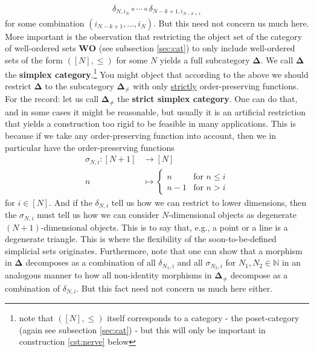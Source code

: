 \begin{align*}
  \delta_{N,i_{N}}
  \circ
  \cdots
  \circ
  \delta_{N-k+1,i_{N-k+1}}
\end{align*}
for some combination $(i_{N-k+1},\ldots,i_{N})$.
But this need not concern us much here.
More important is the observation that restricting the object set of the category of well-ordered sets $\mathbf{WO}$ (see subsection \ref{sec:cat}) to only include well-ordered sets of the form $([N],\leq)$ for some $N$ yields a full subcategory $\mathbf{\Delta}$.
We call $\mathbf{\Delta}$ the \textbf{simplex category}.\footnote{note that $([N],\leq)$ itself corresponds to a category - the poset-category (again see subsection \ref{sec:cat}) - but this will only be important in construction \ref{cst:nerve} below} You might object that according to the above we should restrict $\mathbf{\Delta}$ to the subcategory $\mathbf{\Delta}_{\neq}$ with only \underline{strictly} order-preserving functions.
For the record: let us call $\mathbf{\Delta}_{\neq}$ the \textbf{strict simplex category}.
One can do that, and in some cases it might be reasonable, but usually it is an artificial restriction that yields a construction too rigid to be feasible in many applications.
This is because if we take any order-preserving function into account, then we in particular have the order-preserving functions
\begin{align*}
  \sigma_{N,i}
  \colon
  [N + 1]
  &\rightarrow
  [N]
  \\
  n
  &\mapsto
  \begin{cases}
    n
    &
    \text{for }
    n
    \leq
    i
    \\
    n
    -
    1
    &
    \text{for }
    n
    >
    i
  \end{cases}
\end{align*}
for $i \in [N]$.
And if the $\delta_{N,i}$ tell us how we can restrict to lower dimensions, then the $\sigma_{N,i}$ must tell us how we can consider $N$-dimensional objects as {\glqq}degenerate{\grqq} $(N+1)$-dimensional objects.
This is to say that, e.g., a point or a line is a degenerate triangle.
This is where the flexibility of the soon-to-be-defined simplicial sets originates.
Furthermore, note that one can show that a morphism in $\mathbf{\Delta}$ decomposes as a combination of all $\delta_{N_{1},i}$ and all $\sigma_{N_{2},i}$ for $N_{1},N_{2} \in \mathbb{N}$ in an analogous manner to how all non-identity morphisms in $\mathbf{\Delta}_{\neq}$ decompose as a combination of $\delta_{N,i}$.
But this fact need not concern us much here either.
